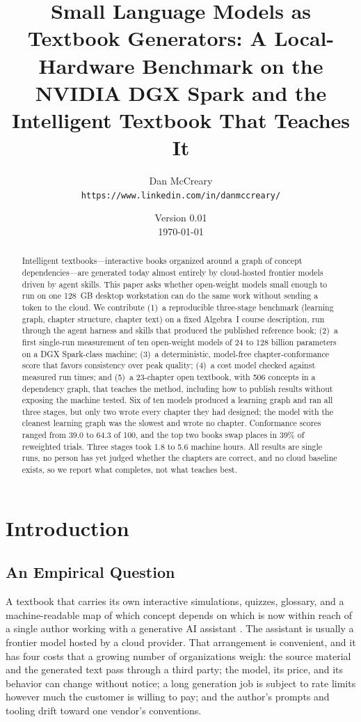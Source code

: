 \documentclass[11pt]{article}
\title{Small Language Models as Textbook Generators: A Local-Hardware Benchmark on the NVIDIA DGX Spark and the Intelligent Textbook That Teaches It}
\author{
    Dan McCreary \\
    \texttt{https://www.linkedin.com/in/danmccreary/}
}
\date{Version 0.01 \\ \today}
\begin{document}
\maketitle

\begin{abstract}
Intelligent textbooks---interactive books organized around a graph of concept dependencies---are generated today almost entirely by cloud-hosted frontier models driven by agent skills. This paper asks whether open-weight models small enough to run on one 128~GB desktop workstation can do the same work without sending a token to the cloud. We contribute (1)~a reproducible three-stage benchmark (learning graph, chapter structure, chapter text) on a fixed Algebra~I course description, run through the agent harness and skills that produced the published reference book; (2)~a first single-run measurement of ten open-weight models of 24 to 128 billion parameters on a DGX Spark-class machine; (3)~a deterministic, model-free chapter-conformance score that favors consistency over peak quality; (4)~a cost model checked against measured run times; and (5)~a 23-chapter open textbook, with 506 concepts in a dependency graph, that teaches the method, including how to publish results without exposing the machine tested. Six of ten models produced a learning graph and ran all three stages, but only two wrote every chapter they had designed; the model with the cleanest learning graph was the slowest and wrote no chapter. Conformance scores ranged from 39.0 to 64.3 of 100, and the top two books swap places in 39\% of reweighted trials. Three stages took 1.8 to 5.6 machine hours. All results are single runs, no person has yet judged whether the chapters are correct, and no cloud baseline exists, so we report what completes, not what teaches best.
\end{abstract}


\section{Introduction}
\label{sec:intro}

\subsection{An Empirical Question}

A textbook that carries its own interactive simulations, quizzes, glossary, and a machine-readable map of which concept depends on which is now within reach of a single author working with a generative AI assistant \cite{brusilovsky2022return, mccreary2025microsims}. The assistant is usually a frontier model hosted by a cloud provider. That arrangement is convenient, and it has four costs that a growing number of organizations weigh: the source material and the generated text pass through a third party; the model, its price, and its behavior can change without notice; a long generation job is subject to rate limits however much the customer is willing to pay; and the author's prompts and tooling drift toward one vendor's conventions.
\end{document}
